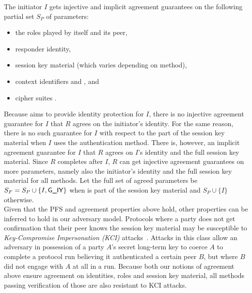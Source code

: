 %

\label{sec:agreedParams}
The initiator $I$ gets injective and implicit agreement guarantees on the
following partial set $S_P$ of parameters:
\begin{itemize}
    \item the roles played by itself and its peer,
    \item responder identity,
    \item session key material (which varies depending on \mEdhoc{} method),
    \item context identifiers \mCi{} and \mCr{}, and
    \item cipher suites \mSuites{}.
\end{itemize}
%
Because \mEdhoc{} aims to provide identity protection for $I$, there is no
injective agreement guarantee for $I$ that $R$ agrees on the initiator's
identity.
%
For the same reason, there is no such guarantee for $I$ with respect to
the \mGiy{} part of the session key material when $I$ uses the \mStat{}
authentication method.
%
There is, however, an implicit agreement guarantee for $I$ that $R$ agrees on
$I$'s identity and the full session key material.
%
Since $R$ completes after $I$, $R$ can get injective agreement guarantees on
more parameters, namely also the initiator's identity and the full session key
material for all methods.
%
Let the full set of agreed parameters be $S_F = S_P \cup \{I, \textsf{G\_IY}\}$
when \mGiy{} is
part of the session key material and $S_P \cup \{I\}$ otherwise.\\
%

Given that the PFS and agreement properties
above hold, other properties can be inferred to hold in our adversary model.
%
Protocols where a party does not get confirmation that their peer knows the
session key material may be susceptible to
\emph{Key-Compromise Impersonation (KCI)}
attacks~\cite{DBLP:conf/ima/Blake-WilsonJM97}.
%
Attacks in this class allow an adversary in possession of a party $A$'s secret
long-term key to coerce $A$ to complete a
protocol run believing it authenticated a certain peer $B$, but where $B$ did
not engage with $A$ at all in a run.
%
Because both our notions of agreement above ensure agreement on identities,
roles and session key material, all methods passing verification of those are
also resistant to KCI attacks.

